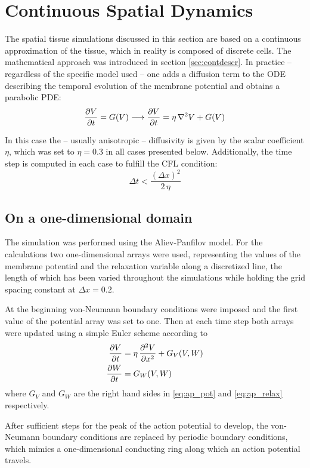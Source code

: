 \section{Continuous Spatial Dynamics}
The spatial tissue simulations discussed in this section are based on a
continuous approximation of the tissue, which in reality is composed of
discrete cells. The mathematical approach was introduced in section
\ref{sec:contdescr}. In practice -- regardless of the specific model used --
one adds a diffusion term to the ODE describing the temporal evolution of the
membrane potential and obtains a parabolic PDE:
\begin{equation*}
    \pdv{V}{t}=G(V)\longrightarrow\pdv{V}{t}=\eta\,\nabla^2{V}+G(V)
\end{equation*}

In this case the -- usually anisotropic -- diffusivity is given by the scalar
coefficient $\eta$, which was set to $\eta=0.3$ in all cases presented below.
Additionally, the time step is computed in each case to fulfill the CFL
condition:
\begin{equation*}
    \Delta{t}<\frac{(\Delta{x})^2}{2\,\eta}
\end{equation*}


\subsection{On a one-dimensional domain}
\label{sec:1d}
The simulation was performed using the Aliev-Panfilov model. For the
calculations two one-dimensional arrays were used, representing the values of the membrane
potential and the relaxation variable along a discretized line, the length of
which has been varied throughout the simulations while holding the grid
spacing constant at $\Delta{x}=0.2$.

At the beginning von-Neumann boundary conditions were imposed and the first
value of the potential array was set to one. Then at each time step both arrays
were updated using a simple Euler scheme according to
\begin{align*}
    \pdv{V}{t}&=\eta\,\pdv[2]{V}{x}+G_{V}(V, W) \\
    \pdv{W}{t}&=G_{W}(V, W)
\end{align*}
where $G_V$ and $G_W$ are the right hand sides in \eqref{eq:ap_pot} and
\eqref{eq:ap_relax} respectively.

After sufficient steps for the peak of the action potential to develop, the
von-Neumann boundary conditions are replaced by periodic boundary
conditions, which mimics a one-dimensional conducting ring along which an
action potential travels.

